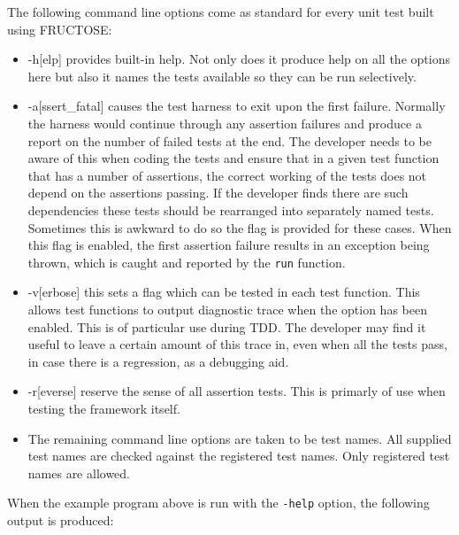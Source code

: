 \documentclass{book}
\begin{document}

The following command line options come as standard
for every unit test built using FRUCTOSE:

\begin{itemize}
\item -h[elp]  provides built-in help. Not only does it produce
help on all the options here but also it names the tests available
so they can be run selectively.

\item -a[ssert\_fatal] causes the test harness to exit upon the first failure.
Normally the harness would continue through any assertion failures
and produce a report on the number of failed tests at the end.
The developer needs to be aware of this when coding the tests and ensure
that in a given test function that has a number of assertions,
the correct working of the tests does not depend on the assertions
passing. If the developer finds there are such dependencies these
tests should be rearranged into separately named tests.
Sometimes this is awkward to do so the flag is provided for these cases.
When this flag is enabled, the first assertion failure results in
an exception being thrown, which is caught and reported 
by the {\tt run} function.

\item -v[erbose] this sets a flag which can be tested in each test
function. This allows test functions to output diagnostic trace
when the option has been enabled. This is of particular use during
TDD. The developer may find it useful to leave a certain amount
of this trace in, even when all the tests pass, in case there
is a regression, as a debugging aid.

\item -r[everse] reserve the sense of all assertion tests.
This is primarly of use when testing the framework itself.

\item The remaining command line options are taken to be test names.
All supplied test names are checked against the registered test names.
Only registered test names are allowed.
\end{itemize}

When the example program above is run with the {\tt -help} option,
the following output is produced:
\end{document}
